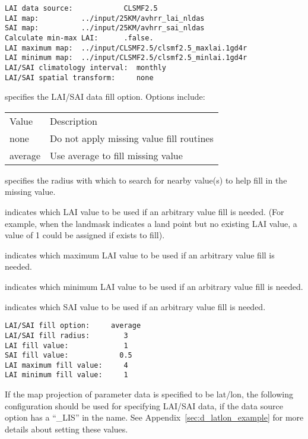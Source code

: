  \begin{Verbatim}[frame=single]
LAI data source:            CLSMF2.5
LAI map:          ../input/25KM/avhrr_lai_nldas               
SAI map:          ../input/25KM/avhrr_sai_nldas           
Calculate min-max LAI:      .false.
LAI maximum map:  ../input/CLSMF2.5/clsmf2.5_maxlai.1gd4r
LAI minimum map:  ../input/CLSMF2.5/clsmf2.5_minlai.1gd4r
LAI/SAI climatology interval:  monthly 
LAI/SAI spatial transform:     none
 \end{Verbatim}

 
  specifies the LAI/SAI
 data fill option.  Options include:

 \begin{tabular}{ll}
 Value   & Description                              \\
 none    & Do not apply missing value fill routines \\
 average & Use average to fill missing value        \\
 \end{tabular}

  specifies the radius with which
 to search for nearby value(s) to help fill in the missing value.

  indicates which LAI 
 value to be used if an arbitrary value fill is needed. 
 (For example, when the landmask indicates a land point but no existing 
 LAI value, a value of 1 could be assigned if 
 exists to fill).
  
  indicates which maximum LAI 
 value to be used if an arbitrary value fill is needed. 
 
  indicates which minimum LAI 
 value to be used if an arbitrary value fill is needed. 

  indicates which SAI
 value to be used if an arbitrary value fill is needed. 
 \nextpar
 

 \begin{Verbatim}[frame=single]
LAI/SAI fill option:     average
LAI/SAI fill radius:        3 
LAI fill value:             1
SAI fill value:            0.5
LAI maximum fill value:     4
LAI minimum fill value:     1
 \end{Verbatim}

 
 If the map projection of parameter data is specified to be lat/lon, 
 the following configuration should be used for specifying LAI/SAI data,
 if  the data source option has a ``\_LIS'' in the name.
 See Appendix~\ref{sec:d_latlon_example} for more details about
 setting these values.
 

